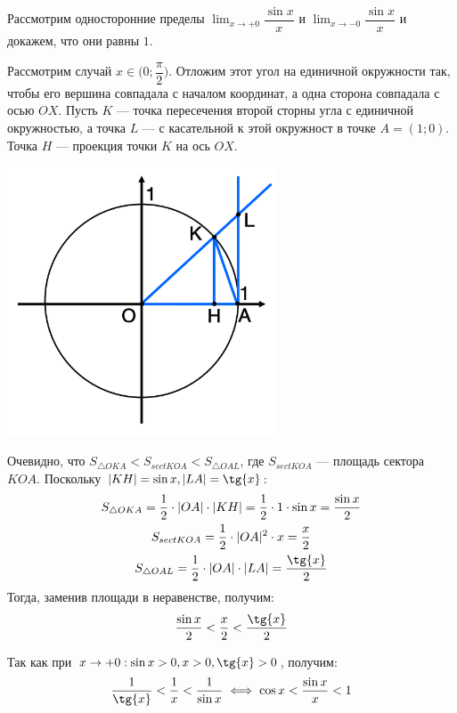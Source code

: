 \documentclass[a4paper,12pt]{extbook}
\theoremstyle{named}
\theoremstyle{named}
\begin{document}
Рассмотрим односторонние пределы \(\displaystyle{\lim_{x \to +0}{\dfrac{\sin{x}}{x}}}\) и \(\displaystyle{\lim_{x \to -0}{\dfrac{\sin{x}}{x}}}\) и докажем, что они равны \(1\).

Рассмотрим случай \(x \in \Big(0; \dfrac{\pi}{2}\Big)\).
Отложим этот угол на единичной окружности так, чтобы его вершина совпадала с началом координат, а одна сторона совпадала с осью \(OX\).
Пусть \(K\) — точка пересечения второй сторны угла с единичной окружностью, а точка \(L\) — с касательной к этой окружност в точке \(A = (1; 0)\). Точка \(H\) — проекция точки \(K\) на ось \(OX\).

\begin{center}
    \includegraphics[width=0.6\textwidth]{limit_1.png}
\end{center}

Очевидно, что \(S_{\triangle OKA} < S_{sect KOA} < S_{\triangle OAL}\), где \(S_{sect KOA}\) — площадь сектора  \(KOA\). Поскольку \(|KH| = \sin{x}, |LA| = \tg{x}\):
\begin{gather*}
    S_{\triangle OKA} = \frac{1}{2} \cdot |OA| \cdot |KH| = \frac{1}{2} \cdot 1 \cdot \sin{x} = \frac{\sin{x}}{2} \\
    S_{sect KOA} = \frac{1}{2} \cdot |OA|^2 \cdot x = \frac{x}{2}                                                 \\
    S_{\triangle OAL} = \frac{1}{2} \cdot |OA| \cdot |LA| = \frac{\tg{x}}{2}
\end{gather*}
Тогда, заменив площади в неравенстве, получим:
\begin{gather*}
    \dfrac{\sin{x}}{2} < \dfrac{x}{2} < \dfrac{\tg{x}}{2}
\end{gather*}

Так как при \(x \to +0: \sin{x} > 0, x > 0, \tg{x} > 0\), получим:
\begin{gather*}
    \dfrac{1}{\tg{x}} < \dfrac{1}{x} < \dfrac{1}{\sin{x}} \iff \cos{x} < \dfrac{\sin{x}}{x} < 1
\end{gather*}
\end{document}
